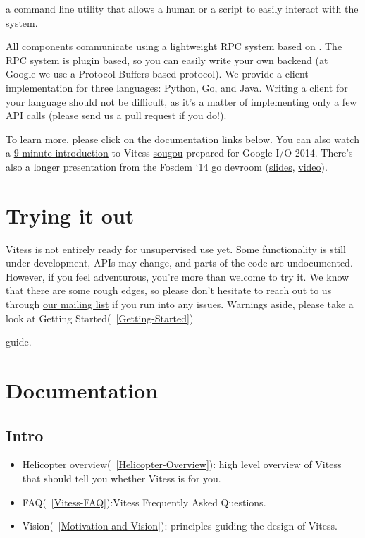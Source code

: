 a command line utility that allows a human or a script to easily
interact with the system.

All components communicate using a lightweight RPC system based on
\href{http://bsonspec.org/}. The RPC system is plugin based, so you can easily
write your own backend (at Google we use a Protocol Buffers based protocol). We
provide a client implementation for three languages: Python, Go, and Java.
Writing a client for your language should not be difficult, as it's a matter of
implementing only a few API calls (please send us a pull request if you do!).

To learn more, please click on the documentation links below.
You can also watch a \href{https://www.youtube.com/watch?v=midJ6b1LkA0}{9 minute introduction}
to Vitess \href{https://github.com/sougou}{sougou} prepared for Google I/O 2014.
There's also a longer presentation from the Fosdem `14 go devroom
(\href{https://github.com/youtube/vitess/blob/master/doc/Vitess2014.pdf?raw=true}{slides},
\href{http://youtu.be/qATTTSg6zXk}{video}).

\section{Trying it out}\hypertarget{trying-it-out}{}\label{trying-it-out}

Vitess is not entirely ready for unsupervised use yet. Some functionality is
still under development, APIs may change, and parts of the code are
undocumented. However, if you feel adventurous, you're more than welcome to try
it. We know that there are some rough edges, so please don't hesitate to reach out
to us through \href{https://groups.google.com/forum/\#!forum/vitess}{our mailing list}
if you run into any issues. Warnings aside, please take a look at Getting Started(~\ref{Getting-Started})

guide.

\section{Documentation}\hypertarget{documentation}{}\label{documentation}

\subsection{Intro}\hypertarget{intro}{}\label{intro}

\begin{itemize}
\item Helicopter overview(~\ref{Helicopter-Overview}):  high level overview of Vitess that should tell you whether Vitess is for you.
\item FAQ(~\ref{Vitess-FAQ}):Vitess Frequently Asked Questions.
\item Vision(~\ref{Motivation-and-Vision}): principles guiding the design of Vitess.
\end{itemize}

